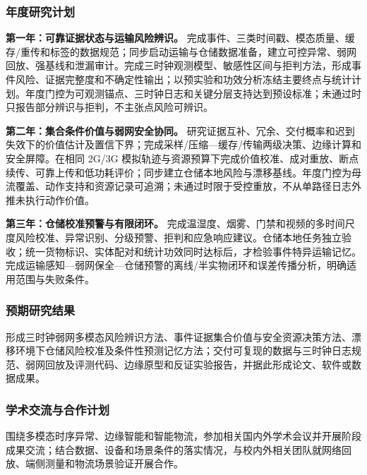 \justifying
\NSFCBodyText

\subsubsection{年度研究计划}

\textbf{第一年：可靠证据状态与运输风险辨识。} 完成事件、三类时间戳、模态质量、缓存/重传和标签的数据规范；同步启动运输与仓储数据准备，建立可控异常、弱网回放、强基线和泄漏审计。完成三时钟观测模型、敏感性区间与拒判方法，形成事件风险、证据完整度和不确定性输出；以预实验和功效分析冻结主要终点与统计计划。年度门控为可观测锚点、三时钟日志和关键分层支持达到预设标准；未通过时只报告部分辨识与拒判，不主张点风险可辨识。

\textbf{第二年：集合条件价值与弱网安全协同。} 研究证据互补、冗余、交付概率和迟到失效下的价值估计及置信下界；完成采样/压缩—缓存/传输两级决策、边缘计算和安全屏障。在相同 2G/3G 模拟轨迹与资源预算下完成价值校准、成对重放、断点续传、可靠上传和低功耗评价；同步建立仓储本地风险与漂移基线。年度门控为母流覆盖、动作支持和资源记录可追溯；未通过时限于受控重放，不从单路径日志外推未执行动作价值。

\textbf{第三年：仓储校准预警与有限闭环。} 完成温湿度、烟雾、门禁和视频的多时间尺度风险校准、异常识别、分级预警、拒判和应急响应建议。仓储本地任务独立验收；统一货物标识、实体配对和统计功效同时达标后，才检验事件特异运输记忆。完成运输感知—弱网保全—仓储预警的离线/半实物闭环和误差传播分析，明确适用范围与失败条件。

\subsubsection{预期研究结果}

形成三时钟弱网多模态风险辨识方法、事件证据集合价值与安全资源决策方法、漂移环境下仓储风险校准及条件性预测记忆方法；交付可复现的数据与三时钟日志规范、弱网回放及评测代码、边缘原型和反证实验报告，并据此形成论文、软件或数据成果。

\subsubsection{学术交流与合作计划}

围绕多模态时序异常、边缘智能和智能物流，参加相关国内外学术会议并开展阶段成果交流；结合数据、设备和场景条件的落实情况，与校内外相关团队就网络回放、端侧测量和物流场景验证开展合作。
